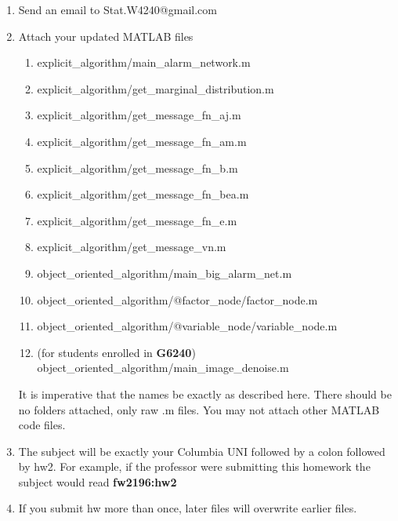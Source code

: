 \documentclass[12pt]{article}
\begin{document}
\begin{enumerate}
	\item Send an email to Stat.W4240@gmail.com
	\item {Attach your updated MATLAB files 
		\begin{enumerate}
			\item explicit\_algorithm/main\_alarm\_network.m
			\item explicit\_algorithm/get\_marginal\_distribution.m
			\item explicit\_algorithm/get\_message\_fn\_aj.m 
			\item explicit\_algorithm/get\_message\_fn\_am.m 
			\item explicit\_algorithm/get\_message\_fn\_b.m 
			\item explicit\_algorithm/get\_message\_fn\_bea.m
			\item explicit\_algorithm/get\_message\_fn\_e.m
			\item explicit\_algorithm/get\_message\_vn.m
			\item object\_oriented\_algorithm/main\_big\_alarm\_net.m
			\item object\_oriented\_algorithm/@factor\_node/factor\_node.m
			\item object\_oriented\_algorithm/@variable\_node/variable\_node.m
			\item (for students enrolled in {\bf G6240}) object\_oriented\_algorithm/main\_image\_denoise.m
		\end{enumerate} It is imperative that the names be exactly as described here. There should be no folders attached, only raw .m files.  You may not attach other MATLAB code files. }
	\item The subject will be exactly your Columbia UNI followed by a colon followed by hw2.  For example, if the professor were submitting this homework the subject would read {\bf fw2196:hw2}
	\item If you submit hw more than once, later files will overwrite earlier files.
\end{enumerate}


\problemsdone
\end{document}
